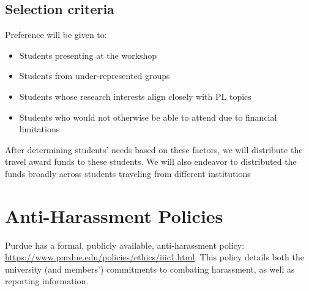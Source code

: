 \documentclass[11pt]{article}
\begin{document}
\subsection{Selection criteria}

Preference will be given to: 

\begin{itemize}
\item Students presenting at the workshop
\item Students from under-represented groups
\item Students whose research interests align closely with PL topics
\item Students who would not otherwise be able to attend due to
financial limitations
\end{itemize}

After determining students' needs based on these
factors, we will distribute the travel award funds to
these students. We will also endeavor to distributed the funds broadly across students traveling from different institutions

\section{Anti-Harassment Policies}

Purdue has a formal, publicly available, anti-harassment policy: \url{https://www.purdue.edu/policies/ethics/iiic1.html}. This policy details both the university (and members') commitments to combating harassment, as well as reporting information.
\end{document}
